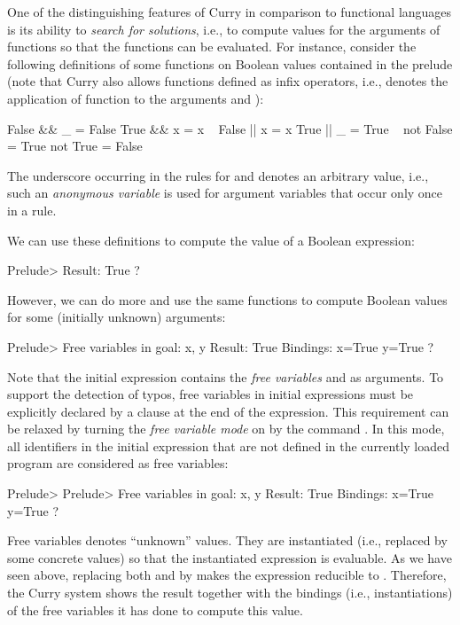 One of the distinguishing features of Curry in comparison
to functional languages is its ability to \emph{search for solutions},
i.e., to compute values for the arguments of functions so that
the functions can be evaluated.
For instance, consider the following definitions of some functions
on Boolean values contained in the prelude (note that
Curry also allows functions defined as infix operators, i.e.,
 denotes the application of function \code{\&\&}
to the arguments  and ):
\begin{prog}
False \&\& _  =  False
True  \&\& x  =  x
~
False || x  =  x
True  || _  =  True
~
not False   =  True
not True    =  False
\end{prog}
The underscore
\ccode{_}\pindex{_}
occurring in the rules for
\code{\&\&} and \code{||} denotes an arbitrary value,
i.e., such an \emph{anonymous variable} is used for argument
variables that occur only once in a rule.

We can use these definitions to compute the value of a Boolean expression:
\begin{prog}
Prelude> 
Result: True ?
\end{prog}
However, we can do more and use the same functions
to compute Boolean values for some (initially unknown) arguments:
\begin{prog}
Prelude> 
Free variables in goal: x, y
Result: True
Bindings: 
x=True
y=True ?
\end{prog}
Note that the initial expression contains the
\emph{free variables}
 and  as arguments.
To support the detection of typos,
free variables in initial expressions must be explicitly declared
by a  clause at the end of the expression.
This requirement can be relaxed by turning the
\emph{free variable mode} on by the command .
In this mode, all identifiers in the initial expression that
are not defined in the currently loaded program are considered as
free variables:
\begin{prog}
Prelude> 
Prelude> 
Free variables in goal: x, y
Result: True
Bindings: 
x=True
y=True ?
\end{prog}
Free variables denotes ``unknown'' values.
They are instantiated (i.e., replaced by some concrete values) so that
the instantiated expression is evaluable. As we have seen above,
replacing both  and  by 
makes the expression reducible to . Therefore,
the Curry system shows the result  together with the
bindings (i.e., instantiations) of the free variables
it has done to compute this value.

